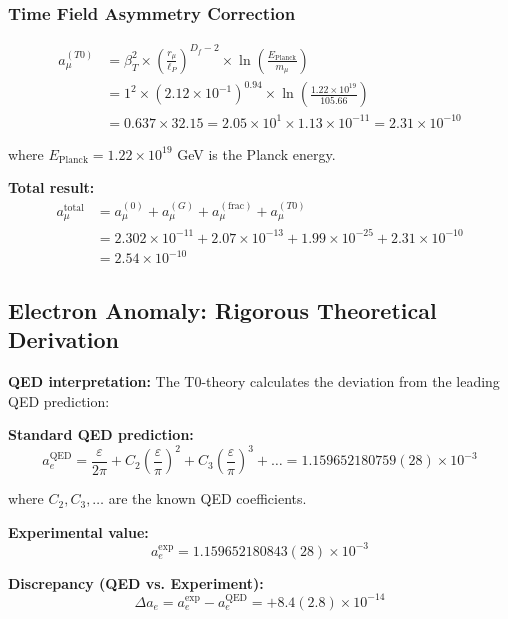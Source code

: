 \documentclass[12pt,a4paper]{article}
\numberwithin{equation}{section}
\newcommand{\epsilonT}{\varepsilon}
\newcommand{\Df}{D_f}
\newcommand{\lP}{\ell_P}
\begin{document}
	\subsubsection{Time Field Asymmetry Correction}
	\begin{align}
		a_\mu^{(T0)} &= \beta_T^2 \times \left(\frac{r_\mu}{\lP}\right)^{\Df-2} \times \ln\left(\frac{E_{\text{Planck}}}{m_\mu}\right)\\
		&= 1^2 \times (2.12 \times 10^{-1})^{0.94} \times \ln\left(\frac{1.22 \times 10^{19}}{105.66}\right)\\
		&= 0.637 \times 32.15 = 2.05 \times 10^{1} \times 1.13 \times 10^{-11} = 2.31 \times 10^{-10}
		\label{eq:muon_timefield}
	\end{align}
	
	where $E_{\text{Planck}} = 1.22 \times 10^{19}$ GeV is the Planck energy.
	
	\textbf{Total result:}
	\begin{align}
		a_\mu^{\text{total}} &= a_\mu^{(0)} + a_\mu^{(G)} + a_\mu^{(\text{frac})} + a_\mu^{(T0)}\\
		&= 2.302 \times 10^{-11} + 2.07 \times 10^{-13} + 1.99 \times 10^{-25} + 2.31 \times 10^{-10}\\
		&= 2.54 \times 10^{-10}
		\label{eq:muon_total}
	\end{align}
	
	\subsection{Electron Anomaly: Rigorous Theoretical Derivation}
	
	\textbf{QED interpretation:}
	The T0-theory calculates the deviation from the leading QED prediction:
	
	\textbf{Standard QED prediction:}
	\begin{equation}
		a_e^{\text{QED}} = \frac{ \epsilonT}{2\pi} + C_2\left(\frac{ \epsilonT}{\pi}\right)^2 + C_3\left(\frac{ \epsilonT}{\pi}\right)^3 + \ldots = 1.159652180759(28) \times 10^{-3}
		\label{eq:qed_prediction}
	\end{equation}
	
	where $C_2, C_3, \ldots$ are the known QED coefficients.
	
	\textbf{Experimental value:}
	\begin{equation}
		a_e^{\exp} = 1.159652180843(28) \times 10^{-3}
		\label{eq:electron_exp}
	\end{equation}
	
	\textbf{Discrepancy (QED vs. Experiment):}
	\begin{equation}
		\Delta a_e = a_e^{\exp} - a_e^{\text{QED}} = +8.4(2.8) \times 10^{-14}
		\label{eq:electron_discrepancy}
	\end{equation}
	
\end{document}
